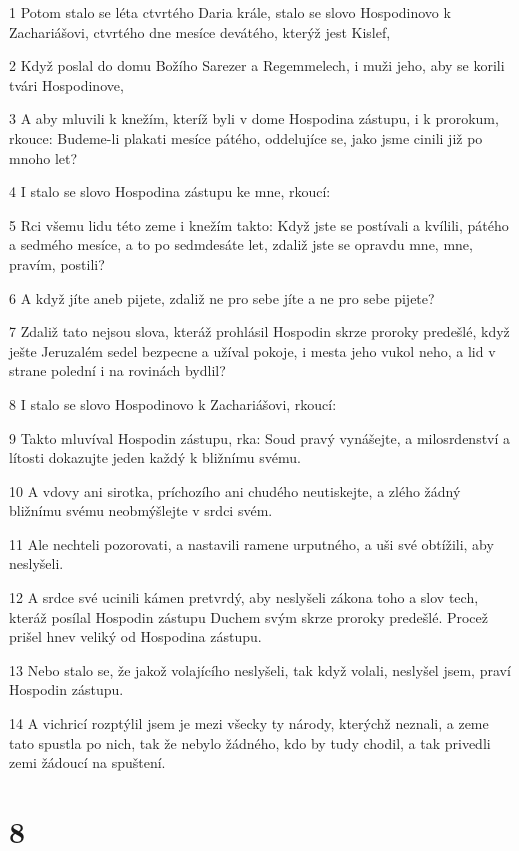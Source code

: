 \par 1 Potom stalo se léta ctvrtého Daria krále, stalo se slovo Hospodinovo k Zachariášovi, ctvrtého dne mesíce devátého, kterýž jest Kislef,
\par 2 Když poslal do domu Božího Sarezer a Regemmelech, i muži jeho, aby se korili tvári Hospodinove,
\par 3 A aby mluvili k knežím, kteríž byli v dome Hospodina zástupu, i k prorokum, rkouce: Budeme-li plakati mesíce pátého, oddelujíce se, jako jsme cinili již po mnoho let?
\par 4 I stalo se slovo Hospodina zástupu ke mne, rkoucí:
\par 5 Rci všemu lidu této zeme i knežím takto: Když jste se postívali a kvílili, pátého a sedmého mesíce, a to po sedmdesáte let, zdaliž jste se opravdu mne, mne, pravím, postili?
\par 6 A když jíte aneb pijete, zdaliž ne pro sebe jíte a ne pro sebe pijete?
\par 7 Zdaliž tato nejsou slova, kteráž prohlásil Hospodin skrze proroky predešlé, když ješte Jeruzalém sedel bezpecne a užíval pokoje, i mesta jeho vukol neho, a lid v strane polední i na rovinách bydlil?
\par 8 I stalo se slovo Hospodinovo k Zachariášovi, rkoucí:
\par 9 Takto mluvíval Hospodin zástupu, rka: Soud pravý vynášejte, a milosrdenství a lítosti dokazujte jeden každý k bližnímu svému.
\par 10 A vdovy ani sirotka, príchozího ani chudého neutiskejte, a zlého žádný bližnímu svému neobmýšlejte v srdci svém.
\par 11 Ale nechteli pozorovati, a nastavili ramene urputného, a uši své obtížili, aby neslyšeli.
\par 12 A srdce své ucinili kámen pretvrdý, aby neslyšeli zákona toho a slov tech, kteráž posílal Hospodin zástupu Duchem svým skrze proroky predešlé. Procež prišel hnev veliký od Hospodina zástupu.
\par 13 Nebo stalo se, že jakož volajícího neslyšeli, tak když volali, neslyšel jsem, praví Hospodin zástupu.
\par 14 A vichricí rozptýlil jsem je mezi všecky ty národy, kterýchž neznali, a zeme tato spustla po nich, tak že nebylo žádného, kdo by tudy chodil, a tak privedli zemi žádoucí na spuštení.

\chapter{8}

